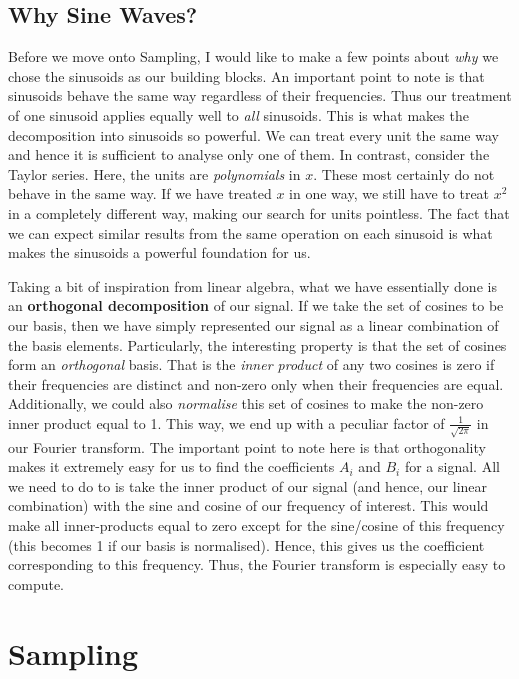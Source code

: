 \documentclass{article}
\theoremstyle{definition}
\begin{document}
	\subsection{Why Sine Waves?}	 
	 Before we move onto Sampling, I would like to make a few points about \textit{why} we chose the sinusoids as our building blocks. An important point to note is that sinusoids behave the same way regardless of their frequencies. Thus our treatment of one sinusoid applies equally well to \textit{all} sinusoids. This is what makes the decomposition into sinusoids so powerful. We can treat every unit the same way and hence it is sufficient to analyse only one of them. In  contrast, consider the Taylor series. Here, the units are \textit{polynomials} in $x$. These most certainly do not behave in the same way. If we have treated $x$ in one way, we still have to treat $x^2$ in a completely different way, making our search for units pointless. The fact that we can expect similar results from the same operation on each sinusoid is what makes the sinusoids a powerful foundation for us. \smallskip
	 
	 Taking a bit of inspiration from linear algebra, what we have essentially done is an \textbf{orthogonal decomposition} of our signal. If we take the set of cosines to be our basis, then we have simply represented our signal as a linear combination of the basis elements. Particularly, the interesting property is that the set of cosines form an \textit{orthogonal} basis. That is the \textit{inner product} of any two cosines is zero if their frequencies are distinct and non-zero only when their frequencies are equal. Additionally, we could also \textit{normalise} this set of cosines to make the non-zero inner product equal to 1. This way, we end up with a peculiar factor of $\frac{1}{\sqrt{2\pi}}$ in our Fourier transform. The important point to note here is that orthogonality makes it extremely easy for us to find the coefficients $A_i$ and $B_i$ for a signal. All we need to do to is take the inner product of our signal (and hence, our linear combination) with the sine and cosine of our frequency of interest. This would make all inner-products equal to zero except for the sine/cosine of this frequency (this becomes 1 if our basis is normalised). Hence, this gives us the coefficient corresponding to this frequency. Thus, the Fourier transform is especially easy to compute.
	 \bigskip
	 
	 \section{Sampling}
\end{document}

